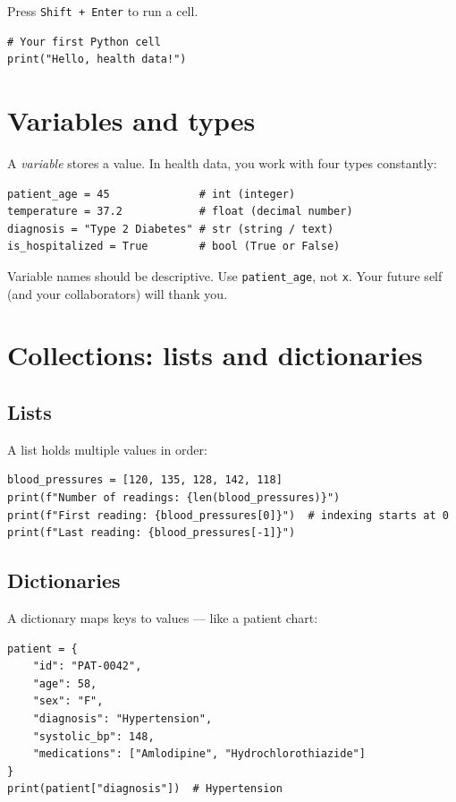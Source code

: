 Press \texttt{Shift + Enter} to run a cell.

\begin{verbatim}
# Your first Python cell
print("Hello, health data!")
\end{verbatim}

\section{Variables and types}

A \emph{variable} stores a value. In health data, you work with four types constantly:

\begin{verbatim}
patient_age = 45              # int (integer)
temperature = 37.2            # float (decimal number)
diagnosis = "Type 2 Diabetes" # str (string / text)
is_hospitalized = True        # bool (True or False)
\end{verbatim}

\begin{pythontip}
Variable names should be descriptive. Use \texttt{patient\_age}, not \texttt{x}. Your future self (and your collaborators) will thank you.
\end{pythontip}

\section{Collections: lists and dictionaries}

\subsection{Lists}

A list holds multiple values in order:
\begin{verbatim}
blood_pressures = [120, 135, 128, 142, 118]
print(f"Number of readings: {len(blood_pressures)}")
print(f"First reading: {blood_pressures[0]}")  # indexing starts at 0
print(f"Last reading: {blood_pressures[-1]}")
\end{verbatim}

\subsection{Dictionaries}

A dictionary maps keys to values --- like a patient chart:
\begin{verbatim}
patient = {
    "id": "PAT-0042",
    "age": 58,
    "sex": "F",
    "diagnosis": "Hypertension",
    "systolic_bp": 148,
    "medications": ["Amlodipine", "Hydrochlorothiazide"]
}
print(patient["diagnosis"])  # Hypertension
\end{verbatim}

